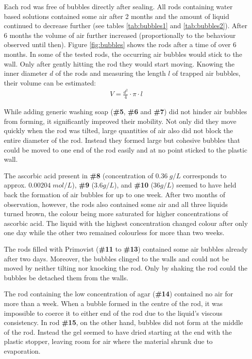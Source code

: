 Each rod was free of bubbles directly after sealing.
All rods containing water based solutions contained some air after 2 months and the amount of liquid continued to decrease further (see tables \ref{tab:bubbles1} and \ref{tab:bubbles2}).
After 6 months the volume of air further increased (proportionally to the behaviour observed until then).
Figure \ref{fig:bubbles} shows the rods after a time of over 6 months.
In some of the tested rods, the occurring air bubbles would stick to the wall.
Only after gently hitting the rod they would start moving.
Knowing the inner diameter $d$ of the rods and measuring the length $l$ of trapped air bubbles, their volume can be estimated:
\begin{align}
 V = \frac{d^2}{4}\cdot \pi \cdot l
\end{align}

While adding generic washing soap (\textbf{\#5}, \textbf{\#6} and \textbf{\#7}) did not hinder air bubbles from forming, it significantly improved their mobility.
Not only did they move quickly when the rod was tilted, large quantities of air also did not block the entire diameter of the rod.
Instead they formed large but cohesive bubbles that could be moved to one end of the rod easily and at no point sticked to the plastic wall.

The ascorbic acid present in \textbf{\#8} (concentration of $0.36 \; g/L$ corresponds to approx. $0.00204 \; mol/L$), \textbf{\#9} ($3.6 g/L$), and \textbf{\#10} ($36 g/L$) seemed to have held back the formation of air bubbles for up to one week.
After two months of observation, however, the rods also contained some air and all three liquids turned brown, the colour being more saturated for higher concentrations of ascorbic acid.
The liquid with the highest concentration changed colour after only one day while the other two remained colourless for more than two weeks.

The rods filled with Primovist (\textbf{\#11} to \textbf{\#13}) contained some air bubbles already after two days.
Moreover, the bubbles clinged to the walls and could not be moved by neither tilting nor knocking the rod.
Only by shaking the rod could the bubbles be detached them from the walls.

The rod containing the low concentration of agar (\textbf{\#14}) contained no air for more than a week.
When a bubble formed in the centre of the rod, it was impossible to coerce it to either end of the rod due to the liquid's viscous consistency.
In rod \textbf{\#15}, on the other hand, bubbles did not form at the middle of the rod.
Instead the gel seemed to have dried starting at the end with the plastic stopper, leaving room for air where the material shrunk due to evaporation.

